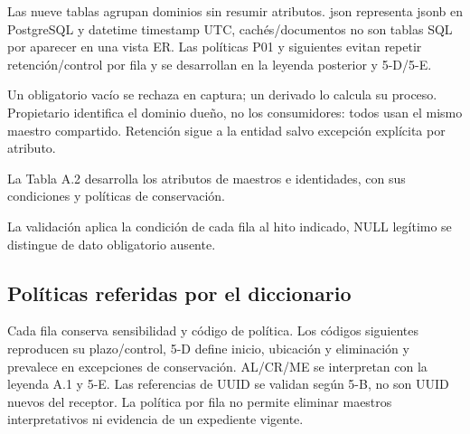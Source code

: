 Las nueve tablas agrupan dominios sin resumir atributos. json representa jsonb en PostgreSQL y datetime timestamp UTC, cachés/documentos no son tablas SQL por aparecer en una vista ER. Las políticas P01 y siguientes evitan repetir retención/control por fila y se desarrollan en la leyenda posterior y 5-D/5-E.

Un obligatorio vacío se rechaza en captura; un derivado lo calcula su proceso. Propietario identifica el dominio dueño, no los consumidores: todos usan el mismo maestro compartido. Retención sigue a la entidad salvo excepción explícita por atributo.


La Tabla A.2 desarrolla los atributos de maestros e identidades, con sus condiciones y políticas de conservación.


















La validación aplica la condición de cada fila al hito indicado, NULL legítimo se distingue de dato obligatorio ausente.

\subsection{Políticas referidas por el diccionario}

Cada fila conserva sensibilidad y código de política. Los códigos siguientes reproducen su plazo/control, 5-D define inicio, ubicación y eliminación y prevalece en excepciones de conservación. AL/CR/ME se interpretan con la leyenda A.1 y 5-E. Las referencias de UUID se validan según 5-B, no son UUID nuevos del receptor. La política por fila no permite eliminar maestros interpretativos ni evidencia de un expediente vigente.

